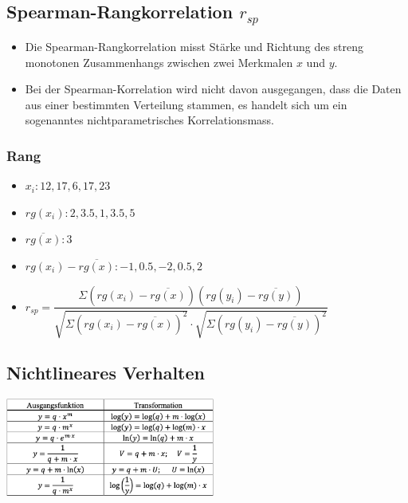 \documentclass[8pt,a4paper]{scrartcl}
\begin{document}
\begin{multicols*}{3}
			\subsection{Spearman-Rangkorrelation $r_{sp}$}		
				\begin{itemize}\itemsep0pt				
					\item Die Spearman-Rangkorrelation misst Stärke und Richtung des streng monotonen Zusammenhangs zwischen  zwei Merkmalen $x$ und $y$.
					\item Bei  der  Spearman-Korrelation  wird  nicht  davon ausgegangen,  dass  die  Daten  aus  einer bestimmten  Verteilung stammen,  es  handelt  sich  um  ein sogenanntes nichtparametrisches Korrelationsmass. 
				\end{itemize}		
					
				\subsubsection{Rang}		
					\begin{itemize}\itemsep0pt				
					\item $x_{i}: 12, 17, 6, 17, 23$
					\item $rg(x_{i}): 2, 3.5, 1, 3.5, 5$
					\item $\overline{rg(x)}: 3$
					\item $rg(x_{i})-\overline{rg(x)}: -1, 0.5, -2, 0.5, 2$
					\item $r_{sp}=\dfrac{\Sigma (rg(x_{i})-\overline{rg(x)})(rg(y_{i})-\overline{rg(y)})}{\sqrt{\Sigma (rg(x_{i})-\overline{rg(x)})^{2}} \cdot \sqrt{\Sigma (rg(y_{i})-\overline{rg(y)})^{2}}}$
				\end{itemize}
				
			 \subsection{Nichtlineares Verhalten}
			     \includegraphics[height=3.25cm]{img/regression1.png} \\



\end{multicols*}
\end{document}
